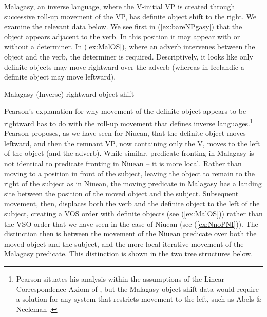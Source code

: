 \documentclass[output=paper,colorlinks,citecolor=brown,
]{langscibook}
\begin{document}
Malagasy, an inverse language, where the V-initial VP is created through successive roll-up movement of the VP, has definite object shift to the right.   We examine the relevant data below.  We see first in (\ref{ex:bareNPgasy}) that the object appears adjacent to the verb. In this position it may  appear with or without a determiner.  In (\ref{ex:MalOS}), where an adverb intervenes between the object and the verb, the determiner is required.  Descriptively, it looks like only definite objects may move rightward over the adverb (whereas in Icelandic a definite object may move leftward). 

\ea Malagasy (Inverse) rightward object shift
	\z
\z

 Pearson's explanation for why movement of the definite object appears to be rightward has to do with the roll-up movement that defines inverse languages.\footnote{Pearson situates his analysis within the assumptions of the Linear Correspondence Axiom of \cite{Kayne:1994}, but the Malagasy object shift data would require a solution for any system that restricts movement to the left, such as Abels \& Neeleman \citeyearpar{Abels:2012}.}  Pearson proposes, as we have seen for Niuean, that the definite object moves leftward, and then the remnant VP, now containing only the V, moves to the left of the object (and the adverb).  While similar, predicate fronting in Malagasy is not identical to  predicate fronting in Niuean -- it is more local.  Rather than moving to a position in front of the subject, leaving the object to remain to the right of the subject as in Niuean, the moving predicate in Malagasy has a landing site between the position of the moved object and the subject.  Subsequent movement, then, displaces both the verb and the definite object to the left of the subject, creating a VOS order with definite objects  (see (\ref{ex:MalOS})) rather than the VSO order that we have seen in the case of Niuean (see (\ref{ex:NnoPNI})).  The distinction then is between the movement of the Niuean predicate over both the moved object and the subject, and the more local iterative movement of the Malagasy predicate.  This distinction is shown in the two tree structures below.
\end{document}
